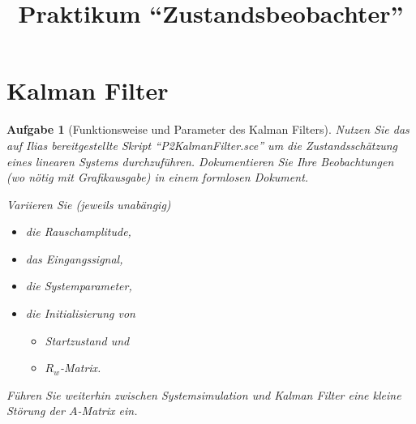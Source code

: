 \documentclass[11pt,a4paper,headsepline]{scrartcl}
\title{Praktikum ``Zustandsbeobachter''}
\date{}
\newtheorem{aufgabe}{Aufgabe}
\newtheorem{loesung}{L\"osung}
\begin{document}
\maketitle
\thispagestyle{fancy}
\vspace{-2cm}

\section*{Kalman Filter}
\begin{aufgabe}[Funktionsweise und Parameter des Kalman Filters]
\label{Task:KF}
Nutzen Sie das auf Ilias bereitgestellte Skript ``P2KalmanFilter.sce'' um die Zustandssch\"atzung eines linearen Systems durchzuf\"uhren. Dokumentieren Sie Ihre Beobachtungen (wo n\"otig mit Grafikausgabe) in einem formlosen Dokument. 

Variieren Sie (jeweils unab\"angig)
\begin{itemize}
	\item die Rauschamplitude,
	\item das Eingangssignal,
	\item die Systemparameter,
	\item die Initialisierung von
	\begin{itemize}
		\item Startzustand und
		\item $R_{w}$-Matrix.
	\end{itemize}
\end{itemize}
F\"uhren Sie weiterhin zwischen Systemsimulation und Kalman Filter eine kleine St\"orung der $A$-Matrix ein.

\small

\end{aufgabe}
\vspace{0.5cm}

\end{document}
